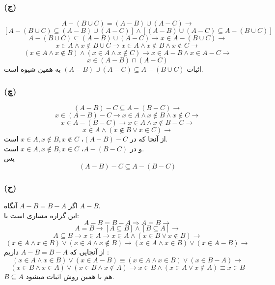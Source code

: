 \documentclass{article}
\begin{document}
            \subsubsection*{(ج)}
                \[A - (B \cup C) = (A - B) \cup (A - C) \rightarrow\]
                \[[A - (B \cup C) \subseteq (A - B) \cup (A - C)] \land [(A - B) \cup (A - C) \subseteq A - (B \cup C)]\]
                \[A - (B \cup C) \subseteq (A - B) \cup (A - C) \rightarrow x \in A - (B \cup C) \rightarrow\]
                \[x \in A \land x \not \in B \cup C \rightarrow x \in A \land x \not \in B \land x \not \in C \rightarrow\]
                \[(x \in A \land x \not \in B) \land (x \in A \land x \not \in C) \rightarrow x \in A - B \land x \in A - C \rightarrow\]
                \[x \in (A - B) \cap (A - C)\]
                اثبات $(A - B) \cup (A - C) \subseteq A - (B \cup C)$ به همین شیوه است.
            
            \subsubsection*{(چ)}
                \[(A - B) - C \subseteq A - (B - C) \rightarrow\]
                \[x \in (A - B) - C \rightarrow x \in A \land x \not \in B \land x \not \in C \rightarrow\]
                \[x \in A - (B - C) \rightarrow x \in A \land x \not \in B - C \rightarrow\]
                \[x \in A \land (x \not \in B \lor x \in C) \rightarrow\]
                از آنجا که در $(A - B) - C$، $x \in A, x \not \in B, x \not \in C$ است.\\ و در $A - (B - C)$، $x \in A, x \not \in B, x \in C$ است.\\
                پس \[(A - B) - C \subseteq A - (B - C)\]
        
            \subsubsection*{(ح)}
                اگر $A - B = B - A$ آنگاه $A - B$.\\
                این گزاره مساری است با:\\
                \[A - B = B - A \Rightarrow A = B \rightarrow \]
                \[A = B \rightarrow [A \subseteq B] \land [B \subseteq A] \rightarrow\]
                \[A \subseteq B \rightarrow x \in A \rightarrow x \in A \land (x \in B \lor x \not \in B) \rightarrow\]
                \[(x \in A \land x \in B) \lor (x \in A \land x \not \in B) \rightarrow (x \in A \land x \in B) \lor (x \in A - B) \rightarrow\]
                از آنجایی که $A - B = B - A$ داریم :\\
                \[(x \in A \land x \in B) \lor (x \in A - B) \equiv (x \in A \land x \in B) \lor (x \in B - A) \rightarrow\]
                \[(x \in B \land x \in A) \lor (x \in B \land x \not \in A) \rightarrow x \in B \land (x \in A \lor x \not \in A) \equiv x \in B\]
                $B \subseteq A$ هم با همین روش اثبات میشود.
        
\end{document}
